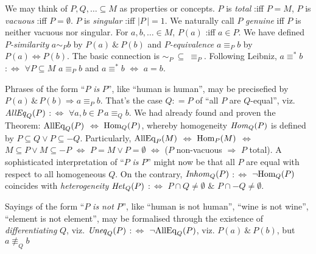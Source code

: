 \documentclass[bsl,meeting]{asl}
\newcommand{\NP}{}
\begin{document}
\thispagestyle{empty}
\NP  
{}
\par 
We may think of 
$ P , Q , \ldots \subseteq M $
as properties or concepts. 
$ P $ 
is {\it total} 
:iff 
$ P = M $, 
$ P $ 
is {\it vacuous} 
:iff 
$ P = \emptyset $. 
$ P $ 
is {\it singular} 
:iff 
$ | P \, | = 1 $.
We 
naturally call 
$ P $ 
{\it genuine} 
iff 
$ P $ 
is neither 
vacuous 
nor
singular.  
For 
$ a , b , \ldots \in M $, 
$ P ( a ) $ :iff $ a \in P $. 
We have defined
$ P ${\em -similarity} 
$ a \sim _P b $
by
$ P ( a ) \  \& \  P ( b ) $
and 
$ P ${\em -equivalence} 
$ a \equiv_P b $
by 
$ P ( a ) \Leftrightarrow P ( b ) $.
The basic connection is 
$ \sim _P \  \subseteq \  \equiv _P $. 
Following Leibniz, 
$ a \equiv ^\ast b $ 
$ : \Leftrightarrow $
$ \forall P \subseteq M $
$ a \equiv _P b $
and 
$ a \equiv ^\ast b $
$ \Leftrightarrow $
$ a = b $.  
\par
Phrases of the form 
``$ P $ {\it is} $ P $'',
like 
``human is human'',
may be precisefied by 
$ P ( a ) \,  \& \,  P ( b ) \Rightarrow a \equiv _P b $. 
That's the case 
$ Q : = P $ 
of 
``all $ P $ are $ Q $-equal'', 
viz. 
$ {\it AllEq} _Q (P) $
$ : \Leftrightarrow $
$ \forall a , b \in P \  a \equiv _Q b $.
We had already found and proven 
the Theorem: 
$ {\rm AllEq} _Q (P) $ 
$ \Leftrightarrow $ 
$ {\rm Hom} _Q ( P ) $, 
whereby
homogeneity
$ {\it Hom} _Q ( P ) $ 
is defined by
$ P \subseteq Q 
\vee 
P \subseteq - Q $.
Particularly,
$ {\rm AllEq} _P ( M ) $ 
$ \Leftrightarrow $ 
$ {\rm Hom} _P ( M ) $
$ \Leftrightarrow $ 
$ M \subseteq P \vee M \subseteq - P $
$ \Leftrightarrow $ 
$ P = M \vee P = \emptyset $
$ \Leftrightarrow $ 
($ P $ non-vacuous 
$ \Rightarrow $ 
$ P $ total). 
A sophisticated interpretation of 
``$ P $ {\it is} $ P $''
might now be that 
all $ P $ are equal with respect to all homogeneous $ Q $. 
On the contrary, 
$ {\it Inhom} _Q ( P ) $
$ :\Leftrightarrow $
$ \neg {\rm Hom} _Q ( P ) $
coincides 
with 
{\it heterogeneity}
$ {\it Het} _Q ( P ) $
$ :\Leftrightarrow $
$ P \cap Q \neq \emptyset $ 
$ \& $ 
$ P \cap - Q \neq \emptyset $. 
\par
Sayings of the form 
``$ P $ {\it is not} $ P $'', 
like 
``human is not human'', 
``wine is not wine'', 
``element is not element'', 
may be formalised 
through the existence of {\it differentiating} 
$ Q $,
viz.  
$ {\it Uneq} _Q ( P ) $
$ : \Leftrightarrow $
$ \neg {\rm AllEq} _Q ( P) $,
viz. 
$ P ( a ) \  \& \  P ( b ) $, 
but 
$ a \not\equiv _Q b $
\end{document}
